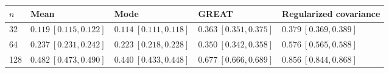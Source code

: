 \begin{tabular}{lllll}
\hline
$n$ & Mean & Mode & GREAT & Regularized covariance \\
\hline
32 & $0.119\ [0.115,0.122]$ & $0.114\ [0.111,0.118]$ & $0.363\ [0.351,0.375]$ & $0.379\ [0.369,0.389]$ \\
64 & $0.237\ [0.231,0.242]$ & $0.223\ [0.218,0.228]$ & $0.350\ [0.342,0.358]$ & $0.576\ [0.565,0.588]$ \\
128 & $0.482\ [0.473,0.490]$ & $0.440\ [0.433,0.448]$ & $0.677\ [0.666,0.689]$ & $0.856\ [0.844,0.868]$ \\
\hline
\end{tabular}
